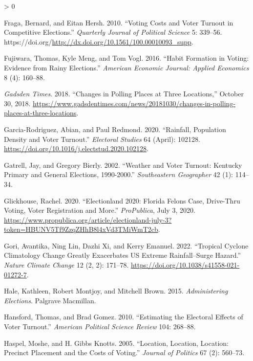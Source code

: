 \documentclass[
  12pt,
]{article}
\newlength{\cslhangindent}
\newenvironment{CSLReferences}[2] %
 {%
  \setlength{\parindent}{0pt}
  \ifodd #1 \everypar{\setlength{\hangindent}{\cslhangindent}}\ignorespaces\fi
  \ifnum #2 > 0
  \setlength{\parskip}{#2\baselineskip}
  \fi
 }%
 {}
\begin{document}
\begin{CSLReferences}{1}{0}
\leavevmode\hypertarget{ref-Fraga2010}{}%
Fraga, Bernard, and Eitan Hersh. 2010. {``Voting {Costs} and {Voter Turnout} in {Competitive Elections}.''} \emph{Quarterly Journal of Political Science} 5: 339--56. https://doi.org/\url{http://dx.doi.org/10.1561/100.00010093_supp}.

\leavevmode\hypertarget{ref-Fujiwara2016}{}%
Fujiwara, Thomas, Kyle Meng, and Tom Vogl. 2016. {``Habit {Formation} in {Voting}: {Evidence} from {Rainy Elections}.''} \emph{American Economic Journal: Applied Economics} 8 (4): 160--88.

\leavevmode\hypertarget{ref-gadsdentimes2018}{}%
\emph{Gadsden Times}. 2018. {``Changes in Polling Places at Three Locations,''} October 30, 2018. \url{https://www.gadsdentimes.com/news/20181030/changes-in-polling-places-at-three-locations}.

\leavevmode\hypertarget{ref-Garcia-Rodriguez2020}{}%
Garcia-Rodriguez, Abian, and Paul Redmond. 2020. {``Rainfall, Population Density and Voter Turnout.''} \emph{Electoral Studies} 64 (April): 102128. \url{https://doi.org/10.1016/j.electstud.2020.102128}.

\leavevmode\hypertarget{ref-Gatrell2002}{}%
Gatrell, Jay, and Gregory Bierly. 2002. {``Weather and {Voter Turnout}: {Kentucky Primary} and {General Elections}, 1990-2000.''} \emph{Southeastern Geographer} 42 (1): 114--34.

\leavevmode\hypertarget{ref-Glickhouse2020}{}%
Glickhouse, Rachel. 2020. {``Electionland 2020: {Florida Felons Case}, {Drive-Thru Voting}, {Voter Registration} and {More}.''} \emph{ProPublica}, July 3, 2020. \url{https://www.propublica.org/article/electionland-july-3?token=HBUNV5Tf9ZzqZHhB8l4xVd3TMiWmT2cb}.

\leavevmode\hypertarget{ref-Gori2022}{}%
Gori, Avantika, Ning Lin, Dazhi Xi, and Kerry Emanuel. 2022. {``Tropical Cyclone Climatology Change Greatly Exacerbates {US} Extreme Rainfall--Surge Hazard.''} \emph{Nature Climate Change} 12 (2, 2): 171--78. \url{https://doi.org/10.1038/s41558-021-01272-7}.

\leavevmode\hypertarget{ref-Hale2015}{}%
Hale, Kathleen, Robert Montjoy, and Mitchell Brown. 2015. \emph{Administering {Elections}}. {Palgrave Macmillan}.

\leavevmode\hypertarget{ref-Hansford2010}{}%
Hansford, Thomas, and Brad Gomez. 2010. {``Estimating the {Electoral Effects} of {Voter Turnout}.''} \emph{American Political Science Review} 104: 268--88.

\leavevmode\hypertarget{ref-Haspel2005}{}%
Haspel, Moshe, and H. Gibbs Knotts. 2005. {``Location, {Location}, {Location}: {Precinct Placement} and the {Costs} of {Voting}.''} \emph{Journal of Politics} 67 (2): 560--73.


\end{CSLReferences}
\end{document}
